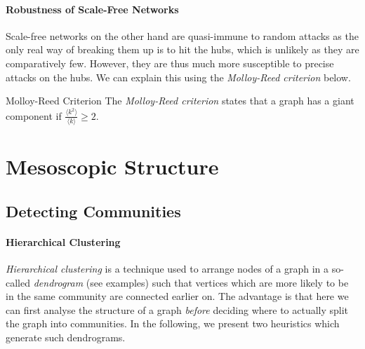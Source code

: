 \documentclass[english]{panikzettel}
\begin{document}
\paragraph{Robustness of Scale-Free Networks}
Scale-free networks on the other hand are quasi-immune to random attacks as the only real way of breaking them up is to hit the hubs, which is unlikely as they are comparatively few.
However, they are thus much more susceptible to precise attacks on the hubs.
We can explain this using the \emph{Molloy-Reed criterion} below.

\begin{defi}{Molloy-Reed Criterion}
    The \textit{Molloy-Reed criterion} states that a graph has a giant component if $\frac{\langle k^2 \rangle}{\langle k \rangle} \ge 2$.
\end{defi}

\section{Mesoscopic Structure}

\subsection{Detecting Communities}

\paragraph{Hierarchical Clustering}

\textit{Hierarchical clustering} is a technique used to arrange nodes of a graph in a so-called \textit{dendrogram} (see examples) such that vertices which are more likely to be in the same community are connected earlier on. The advantage is that here we can first analyse the structure of a graph \textit{before} deciding where to actually split the graph into communities. In the following, we present two heuristics which generate such dendrograms.


\medskip
\end{document}
